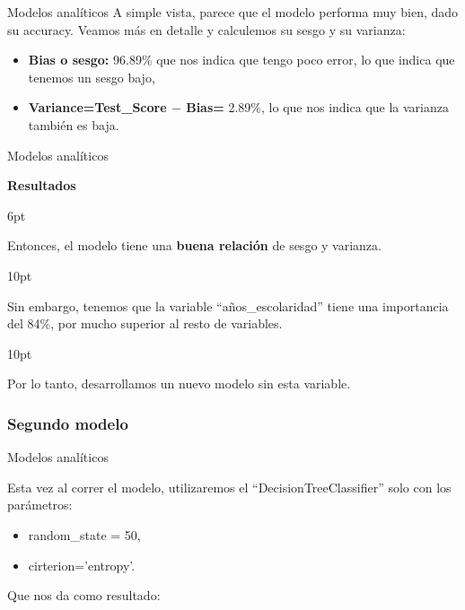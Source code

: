 \documentclass[pdf]{beamer}
\def\vspace{}%
\begin{document}
{\begin{frame}{Modelos analíticos}
    A simple vista, parece que el modelo performa muy bien, dado su accuracy. Veamos más en detalle y calculemos su sesgo y su varianza:
    \begin{itemize}
        \item \textbf{Bias o sesgo:} 96.89\% que nos indica que tengo poco error, lo que indica que tenemos un sesgo bajo,
        \item \textbf{Variance=Test\_Score $-$ Bias=} 2.89\%, lo que nos indica que la varianza también es baja.
    \end{itemize}

\end{frame}

\begin{frame}{Modelos analíticos}
 \begin{Large}
        \textbf{Resultados}
    \end{Large}
    \vspace{6pt}
    
    Entonces, el modelo tiene una \textbf{buena relación} de sesgo y varianza.

\vspace{10pt}
    
Sin embargo, tenemos que la variable ``años\_escolaridad'' tiene una importancia del 84\%, por mucho superior al resto de variables.

\vspace{10pt}

    Por lo tanto, desarrollamos un nuevo modelo sin esta variable. 

\end{frame}

        \subsubsection{Segundo modelo}

\begin{frame}{Modelos analíticos}

    Esta vez al correr el modelo, utilizaremos el ``DecisionTreeClassifier'' solo con los parámetros:
    \begin{itemize}
        \item random\_state = 50,
        \item cirterion='entropy'.
    \end{itemize}
    Que nos da como resultado:  


\end{frame}}
\end{document}
